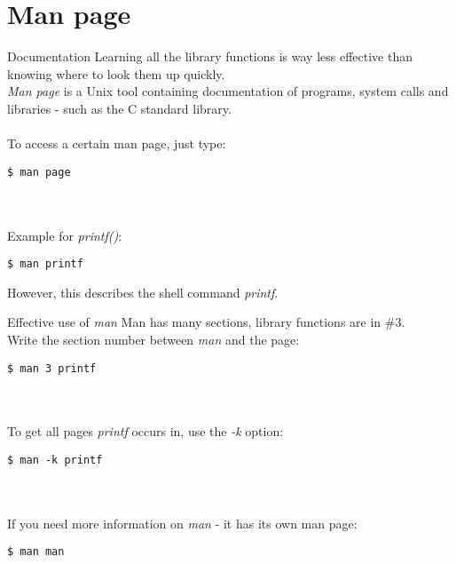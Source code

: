 \section{Man page}

\begin{frame}[fragile]{Documentation}
	Learning all the library functions is way less effective than knowing where to look them up quickly. \\
	\textit{Man page} is a Unix tool containing documentation of programs, system calls and libraries - such as the C standard library. \\ \ \\
	To access a certain man page, just type:
	\begin{lstlisting}[numbers=none, basicstyle=\itshape\small]
$ man page
\end{lstlisting} \ \\ \ \\
Example for \textit{printf()}:
	\begin{lstlisting}[numbers=none]
$ man printf
\end{lstlisting}
However, this describes the shell command \textit{printf}.
\end{frame}


\begin{frame}[fragile]{Effective use of \textit{man}}
	Man has many sections, library functions are in \#3. \\
	Write the section number between \textit{man} and the page:
	\begin{lstlisting}[numbers=none]
$ man 3 printf
\end{lstlisting} \ \\ \ \\
	To get all pages \textit{printf} occurs in, use the \textit{-k} option:
	\begin{lstlisting}[numbers=none]
$ man -k printf
\end{lstlisting} \ \\ \ \\
	If you need more information on \textit{man} - it has its own man page:
	\begin{lstlisting}[numbers=none]
$ man man
\end{lstlisting}
\end{frame}

